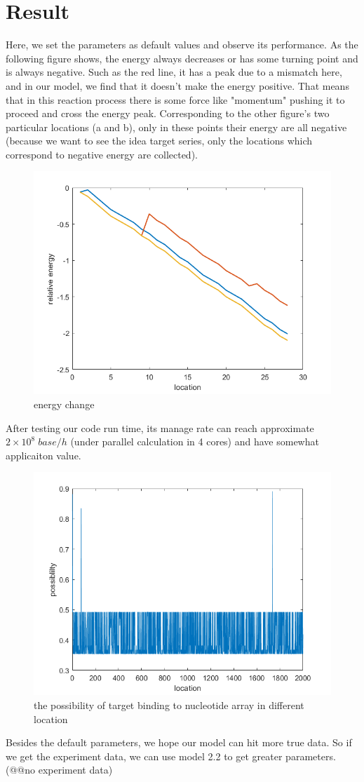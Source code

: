 \section{Result}
Here, we set the parameters as default values and observe its performance. As the following figure shows, the energy always decreases or has some turning point and is always negative. Such as the red line, it has a peak due to a mismatch here, and in our model, we find that it doesn't make the energy positive. That means that in this reaction process there is some force like "momentum" pushing it to proceed and cross the energy peak. Corresponding to the other figure's two particular locations (a and b), only in these points their energy are all negative (because we want to see the idea target series, only the locations which correspond to negative energy are collected).
\begin{figure}[h]
\centering
\includegraphics[width=0.7\linewidth]{energy_change}
\caption{energy change}
\label{fig:energychange}
\end{figure}
After testing our code run time, its manage rate can reach approximate $2\times10^8\;base/h$ (under parallel calculation in 4 cores) and have somewhat applicaiton value. 
\begin{figure}[h]
\centering
\includegraphics[width=0.7\linewidth]{fig1}
\caption{the possibility of target binding to nucleotide array in different location}
\label{fig:fig1}
\end{figure}
Besides the default parameters, we hope our model can hit more true data. So if we get the experiment data, we can use model 2.2 to get greater parameters. (@@no experiment data) 
